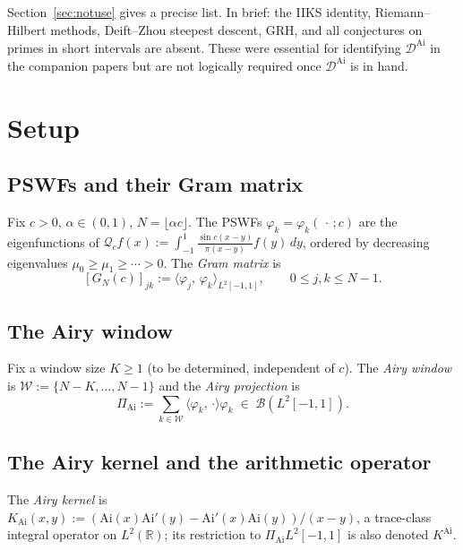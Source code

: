 \documentclass[12pt,a4paper]{amsart}
\theoremstyle{definition}
\newcommand{\KAi}{K^{\mathrm{Ai}}}
\newcommand{\DAi}{\mathcal{D}^{\mathrm{Ai}}}
\newcommand{\PAi}{\Pi_{\mathrm{Ai}}}
\newcommand{\GN}{G_N(c)}
\newcommand{\ip}[2]{\langle #1,\, #2 \rangle}
\begin{document}
Section~\ref{sec:notuse} gives a precise list.
In brief: the IIKS identity, Riemann--Hilbert methods, Deift--Zhou
steepest descent, GRH, and all conjectures on primes in short intervals
are absent.
These were essential for identifying $\DAi$ in the companion papers
but are not logically required once $\DAi$ is in hand.

\section{Setup}
\label{sec:setup}

\subsection{PSWFs and their Gram matrix}

Fix $c > 0$, $\alpha \in (0,1)$, $N = \lfloor\alpha c\rfloor$.
The PSWFs $\varphi_k = \varphi_k(\,\cdot\,;c)$ are the eigenfunctions of
$\mathcal{Q}_c f(x) := \int_{-1}^{1} \frac{\sin c(x-y)}{\pi(x-y)} f(y)\,dy$,
ordered by decreasing eigenvalues $\mu_0 \ge \mu_1 \ge \cdots > 0$.
The \emph{Gram matrix} is
\begin{equation}\label{eq:gram}
  [\GN]_{jk} := \ip{\varphi_j}{\varphi_k}_{L^2[-1,1]},
  \qquad 0 \le j,k \le N-1.
\end{equation}

\subsection{The Airy window}

Fix a window size $K \ge 1$ (to be determined, independent of $c$).
The \emph{Airy window} is $\mathcal{W} := \{N-K,\ldots,N-1\}$ and the
\emph{Airy projection} is
\begin{equation}\label{eq:Pai}
  \PAi := \sum_{k \in \mathcal{W}} \ip{\varphi_k}{\cdot}\varphi_k
  \;\in\; \mathcal{B}(L^2[-1,1]).
\end{equation}

\subsection{The Airy kernel and the arithmetic operator}

The \emph{Airy kernel} is
$K_{\mathrm{Ai}}(x,y) := (\mathrm{Ai}(x)\mathrm{Ai}'(y) - \mathrm{Ai}'(x)\mathrm{Ai}(y))/(x-y)$,
a trace-class integral operator on $L^2(\mathbb{R})$;
its restriction to $\PAi L^2[-1,1]$ is also denoted $\KAi$.
\end{document}

